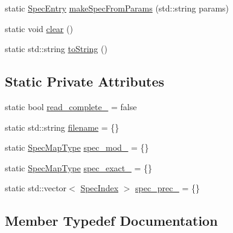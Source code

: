 \begin{DoxyCompactItemize}
\item 
static \hyperlink{structvt_1_1vrt_1_1collection_1_1balance_1_1_spec_entry}{Spec\+Entry} \hyperlink{structvt_1_1vrt_1_1collection_1_1balance_1_1_read_l_b_spec_a4a3fc33794511c6d74d6e4a70eb72682}{make\+Spec\+From\+Params} (std\+::string params)
\item 
static void \hyperlink{structvt_1_1vrt_1_1collection_1_1balance_1_1_read_l_b_spec_aa92db6434f6eb0839312f914139d296c}{clear} ()
\item 
static std\+::string \hyperlink{structvt_1_1vrt_1_1collection_1_1balance_1_1_read_l_b_spec_a2953391fdad20794e17de23b39ee2fad}{to\+String} ()
\end{DoxyCompactItemize}
\subsection*{Static Private Attributes}
\begin{DoxyCompactItemize}
\item 
static bool \hyperlink{structvt_1_1vrt_1_1collection_1_1balance_1_1_read_l_b_spec_af5c8b5f02b64bb47b59351d6facf465e}{read\+\_\+complete\+\_\+} = false
\item 
static std\+::string \hyperlink{structvt_1_1vrt_1_1collection_1_1balance_1_1_read_l_b_spec_a51ddefee7236d3128e5d906675d5a74d}{filename} = \{\}
\item 
static \hyperlink{structvt_1_1vrt_1_1collection_1_1balance_1_1_read_l_b_spec_aa73c3611c615832402eeeed6fb7b8049}{Spec\+Map\+Type} \hyperlink{structvt_1_1vrt_1_1collection_1_1balance_1_1_read_l_b_spec_a72033347ba73a23dd3494ead118e44d1}{spec\+\_\+mod\+\_\+} = \{\}
\item 
static \hyperlink{structvt_1_1vrt_1_1collection_1_1balance_1_1_read_l_b_spec_aa73c3611c615832402eeeed6fb7b8049}{Spec\+Map\+Type} \hyperlink{structvt_1_1vrt_1_1collection_1_1balance_1_1_read_l_b_spec_a40226a2163e4cc03bc48f766df0bb78d}{spec\+\_\+exact\+\_\+} = \{\}
\item 
static std\+::vector$<$ \hyperlink{namespacevt_1_1vrt_1_1collection_1_1balance_a72a5e0d9936ddf57f8e6c64e0e9fd123}{Spec\+Index} $>$ \hyperlink{structvt_1_1vrt_1_1collection_1_1balance_1_1_read_l_b_spec_a53d7c8950db9d6b4d8b7d895d0a264d0}{spec\+\_\+prec\+\_\+} = \{\}
\end{DoxyCompactItemize}


\subsection{Member Typedef Documentation}
\mbox{\label{structvt_1_1vrt_1_1collection_1_1balance_1_1_read_l_b_spec_a05e30b32f0ca5df2cb160514fa0eeb41}} 
